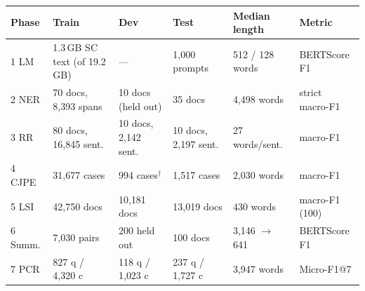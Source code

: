 \begin{tabular}{llllll}
\toprule
Phase & Train & Dev & Test & Median length & Metric\\
\midrule
1 LM & 1.3\,GB SC text (of 19.2\,GB) & --- & 1{,}000 prompts & 512 / 128 words & BERTScore F1\\
2 NER & 70 docs, 8{,}393 spans & 10 docs (held out) & 35 docs & 4{,}498 words & strict macro-F1\\
3 RR & 80 docs, 16{,}845 sent. & 10 docs, 2{,}142 sent. & 10 docs, 2{,}197 sent. & 27 words/sent. & macro-F1\\
4 CJPE & 31{,}677 cases & 994 cases$^\dagger$ & 1{,}517 cases & 2{,}030 words & macro-F1\\
5 LSI & 42{,}750 docs & 10{,}181 docs & 13{,}019 docs & 430 words & macro-F1 (100)\\
6 Summ. & 7{,}030 pairs & 200 held out & 100 docs & 3{,}146 $\to$ 641 & BERTScore F1\\
7 PCR & 827 q / 4{,}320 c & 118 q / 1{,}023 c & 237 q / 1{,}727 c & 3{,}947 words & Micro-F1@7\\
\bottomrule
\end{tabular}
